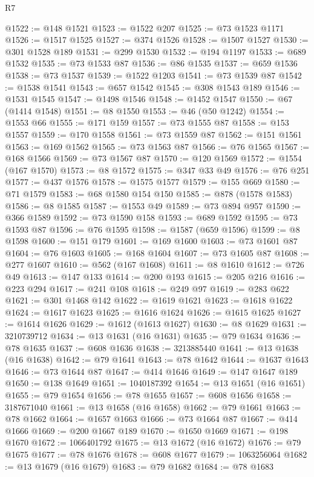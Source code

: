 \begin{lexlean}{R7}
\begin{coremodule}
@1522 := @148 @1521
@1523 := @1522 @207
@1525 := @73 @1523 @1171
@1526 := @1517 @1525
@1527 := @374 @1526
@1528 := @1507 @1527
@1530 := @301 @1528 @189
@1531 := @299 @1530
@1532 := @194 @1197
@1533 := @689 @1532
@1535 := @73 @1533 @87
@1536 := @86 @1535
@1537 := @659 @1536
@1538 := @73 @1537
@1539 := @1522 @1203
@1541 := @73 @1539 @87
@1542 := @1538 @1541
@1543 := @657 @1542
@1545 := @308 @1543 @189
@1546 := @1531 @1545
@1547 := @1498 @1546
@1548 := @1452 @1547
@1550 := @67 (@1414 @1548)
@1551 := @8 @1550
@1553 := @46 (@50 @1242)
@1554 := @1553 @66
@1555 := @171 @159
@1557 := @73 @1555 @87
@1558 := @153 @1557
@1559 := @170 @1558
@1561 := @73 @1559 @87
@1562 := @151 @1561
@1563 := @169 @1562
@1565 := @73 @1563 @87
@1566 := @76 @1565
@1567 := @168 @1566
@1569 := @73 @1567 @87
@1570 := @120 @1569
@1572 := @1554 (@167 @1570)
@1573 := @8 @1572
@1575 := @347 @33 @49
@1576 := @76 @251
@1577 := @437 @1576
@1578 := @1575 @1577
@1579 := @155 @669
@1580 := @71 @1579
@1583 := @68 @1580 @154 @150
@1585 := @878 (@1578 @1583)
@1586 := @8 @1585
@1587 := @1553 @49
@1589 := @73 @894 @957
@1590 := @366 @1589
@1592 := @73 @1590 @158
@1593 := @689 @1592
@1595 := @73 @1593 @87
@1596 := @76 @1595
@1598 := @1587 (@659 @1596)
@1599 := @8 @1598
@1600 := @151 @179
@1601 := @169 @1600
@1603 := @73 @1601 @87
@1604 := @76 @1603
@1605 := @168 @1604
@1607 := @73 @1605 @87
@1608 := @277 @1607
@1610 := @562 (@167 @1608)
@1611 := @8 @1610
@1612 := @726 @49
@1613 := @147 @133
@1614 := @200 @193
@1615 := @205 @216
@1616 := @223 @294
@1617 := @241 @108
@1618 := @249 @97
@1619 := @283 @622
@1621 := @301 @1468 @142
@1622 := @1619 @1621
@1623 := @1618 @1622
@1624 := @1617 @1623
@1625 := @1616 @1624
@1626 := @1615 @1625
@1627 := @1614 @1626
@1629 := @1612 (@1613 @1627)
@1630 := @8 @1629
@1631 := 3210739712
@1634 := @13 @1631 (@16 @1631)
@1635 := @79 @1634
@1636 := @78 @1635
@1637 := @608 @1636
@1638 := 3213885440
@1641 := @13 @1638 (@16 @1638)
@1642 := @79 @1641
@1643 := @78 @1642
@1644 := @1637 @1643
@1646 := @73 @1644 @87
@1647 := @414 @1646
@1649 := @147 @1647 @189
@1650 := @138 @1649
@1651 := 1040187392
@1654 := @13 @1651 (@16 @1651)
@1655 := @79 @1654
@1656 := @78 @1655
@1657 := @608 @1656
@1658 := 3187671040
@1661 := @13 @1658 (@16 @1658)
@1662 := @79 @1661
@1663 := @78 @1662
@1664 := @1657 @1663
@1666 := @73 @1664 @87
@1667 := @414 @1666
@1669 := @200 @1667 @189
@1670 := @1650 @1669
@1671 := @198 @1670
@1672 := 1066401792
@1675 := @13 @1672 (@16 @1672)
@1676 := @79 @1675
@1677 := @78 @1676
@1678 := @608 @1677
@1679 := 1063256064
@1682 := @13 @1679 (@16 @1679)
@1683 := @79 @1682
@1684 := @78 @1683

\end{coremodule}
\end{lexlean}
